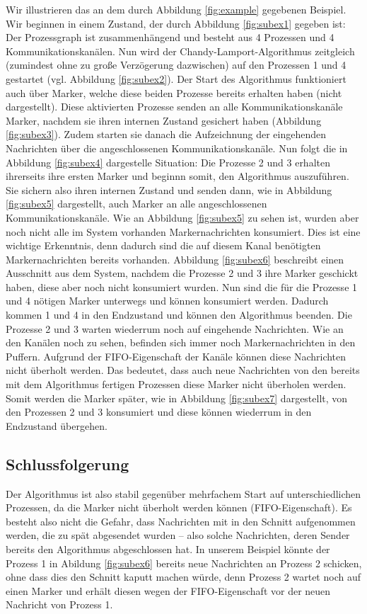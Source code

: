 \documentclass[a4paper,
12pt,
BCOR12mm,
]{scrartcl}
\begin{document}
Wir illustrieren das an dem durch Abbildung \ref{fig:example} gegebenen Beispiel. Wir
beginnen in einem Zustand, der durch Abbildung \ref{fig:subex1} gegeben ist: Der
Prozessgraph ist zusammenhängend und besteht aus 4 Prozessen und 4 Kommunikationskanälen.
Nun wird der Chandy-Lamport-Algorithmus zeitgleich (zumindest ohne zu große Verzögerung
dazwischen) auf den Prozessen 1 und 4 gestartet (vgl. Abbildung \ref{fig:subex2}). Der
Start des Algorithmus funktioniert auch über Marker, welche diese beiden Prozesse bereits
erhalten haben (nicht dargestellt). Diese aktivierten Prozesse senden an alle
Kommunikationskanäle Marker, nachdem sie ihren internen Zustand gesichert haben (Abbildung
\ref{fig:subex3}). Zudem starten sie danach die Aufzeichnung der eingehenden Nachrichten
über die angeschlossenen Kommunikationskanäle. Nun folgt die in Abbildung \ref{fig:subex4}
dargestelle Situation: Die Prozesse 2 und 3 erhalten ihrerseits ihre ersten Marker und
beginnn somit, den Algorithmus auszuführen. Sie sichern also ihren internen Zustand und
senden dann, wie in Abbildung \ref{fig:subex5} dargestellt, auch Marker an alle
angeschlossenen Kommunikationskanäle. Wie an Abbildung \ref{fig:subex5} zu sehen ist,
wurden aber noch nicht alle im System vorhanden Markernachrichten konsumiert. Dies ist
eine wichtige Erkenntnis, denn dadurch sind die auf diesem Kanal benötigten
Markernachrichten bereits vorhanden. Abbildung \ref{fig:subex6} beschreibt einen
Ausschnitt aus dem System, nachdem die Prozesse 2 und 3 ihre Marker geschickt haben, diese
aber noch nicht konsumiert wurden. Nun sind die für die Prozesse 1 und 4 nötigen Marker
unterwegs und können konsumiert werden. Dadurch kommen 1 und 4 in den Endzustand und
können den Algorithmus beenden. Die Prozesse 2 und 3 warten wiederrum noch auf eingehende
Nachrichten. Wie an den Kanälen noch zu sehen, befinden sich immer noch Markernachrichten
in den Puffern. Aufgrund der FIFO-Eigenschaft der Kanäle können diese Nachrichten nicht
überholt werden. Das bedeutet, dass auch neue Nachrichten von den bereits mit dem
Algorithmus fertigen Prozessen diese Marker nicht überholen werden. Somit werden die
Marker später, wie in Abbildung \ref{fig:subex7} dargestellt,
von den Prozessen 2 und 3 konsumiert und diese können wiederrum in den Endzustand
übergehen.

\subsection{Schlussfolgerung}
Der Algorithmus ist also stabil gegenüber mehrfachem Start auf unterschiedlichen
Prozessen, da die Marker nicht überholt werden können (FIFO-Eigenschaft). Es besteht also
nicht die Gefahr, dass Nachrichten mit in den Schnitt aufgenommen werden, die zu spät
abgesendet wurden -- also solche Nachrichten, deren Sender bereits den Algorithmus
abgeschlossen hat. In unserem Beispiel könnte der Prozess 1 in Abildung \ref{fig:subex6} bereits neue Nachrichten an
Prozess 2 schicken, ohne dass dies den Schnitt kaputt machen würde, denn Prozess 2 wartet
noch auf einen Marker und erhält diesen wegen der FIFO-Eigenschaft vor der neuen Nachricht
von Prozess 1.
\end{document}
